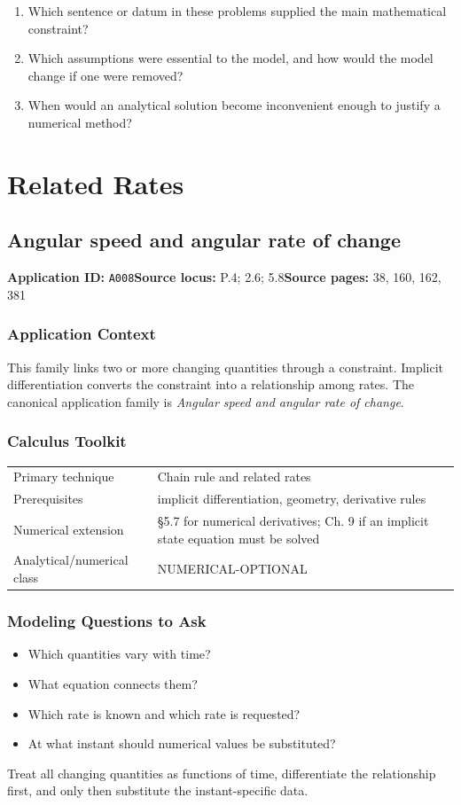 \documentclass[11pt]{book}
\newcommand{\pid}[1]{\texttt{#1}}
\begin{document}
\begin{reflectionbox}\begin{enumerate}
\item Which sentence or datum in these problems supplied the main mathematical constraint?
\item Which assumptions were essential to the model, and how would the model change if one were removed?
\item When would an analytical solution become inconvenient enough to justify a numerical method?
\end{enumerate}\end{reflectionbox}
\part{Related Rates}
\chapter{Angular speed and angular rate of change}\label{app:A008}
\textbf{Application ID:} \pid{A008}\quad \textbf{Source locus:} P.4; 2.6; 5.8\quad \textbf{Source pages:} 38, 160, 162, 381
\section*{Application Context}
This family links two or more changing quantities through a constraint. Implicit differentiation converts the constraint into a relationship among rates. The canonical application family is \emph{Angular speed and angular rate of change}.
\section*{Calculus Toolkit}
\begin{tabularx}{\textwidth}{@{}lX@{}}\toprule
Primary technique & Chain rule and related rates \\
Prerequisites & implicit differentiation, geometry, derivative rules \\
Numerical extension & §5.7 for numerical derivatives; Ch. 9 if an implicit state equation must be solved \\
Analytical/numerical class & NUMERICAL-OPTIONAL \\
\bottomrule\end{tabularx}
\section*{Modeling Questions to Ask}\begin{itemize}
\item Which quantities vary with time?
\item What equation connects them?
\item Which rate is known and which rate is requested?
\item At what instant should numerical values be substituted?
\end{itemize}
\begin{errorbox}Treat all changing quantities as functions of time, differentiate the relationship first, and only then substitute the instant-specific data.\end{errorbox}
\end{document}
